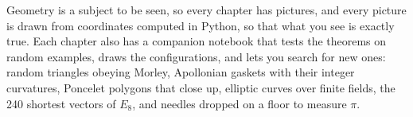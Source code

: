 Geometry is a subject to be seen, so every chapter has pictures, and every picture is drawn from coordinates
computed in Python, so that what you see is exactly true. Each chapter also has a companion notebook that
tests the theorems on random examples, draws the configurations, and lets you search for new ones: random
triangles obeying Morley, Apollonian gaskets with their integer curvatures, Poncelet polygons that close up,
elliptic curves over finite fields, the 240 shortest vectors of $E_8$, and needles dropped on a floor to
measure $\pi$.
